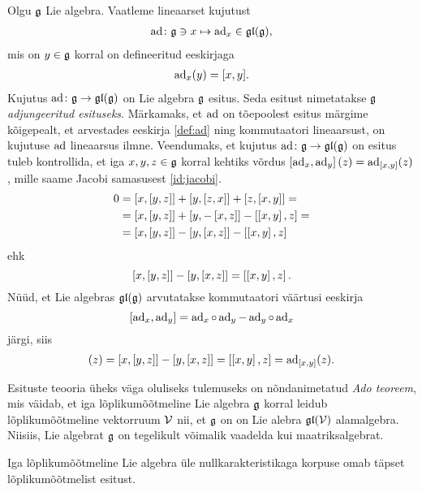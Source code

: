 \begin{naide}\label{naide:adjoint-repr}
    Olgu $\mathfrak{g}$ Lie algebra. Vaatleme lineaarset kujutust
    \begin{align*}
        \operatorname{ad} \colon \mathfrak{g} \ni x \mapsto \operatorname{ad}_x \in \mathfrak{gl}(\mathfrak{g}),
    \end{align*}
    mis on $y \in \mathfrak{g}$ korral on defineeritud eeskirjaga
    \begin{align}\label{def:ad}
        \operatorname{ad}_x(y) = [x, y].
    \end{align}
    Kujutus $\operatorname{ad} \colon \mathfrak{g} \to \mathfrak{gl}(\mathfrak{g})$ on Lie algebra $\mathfrak{g}$ esitus. Seda esitust
    nimetatakse $\mathfrak{g}$ \emph{adjungeeritud esituseks}. Märkamaks, et $\operatorname{ad}$ on
    tõepoolest esitus märgime kõigepealt, et arvestades eeskirja
    \eqref{def:ad} ning kommutaatori lineaarsust, on kujutuse $\operatorname{ad}$
    lineaarsus ilmne. Veendumaks, et kujutus $\operatorname{ad} \colon \mathfrak{g} \to \mathfrak{gl}(\mathfrak{g})$ on
    esitus tuleb kontrollida, et iga $x, y, z \in \mathfrak{g}$ korral kehtiks võrdus
    $\left[ \operatorname{ad}_x, \operatorname{ad}_y \right](z) = \operatorname{ad}_{[x, y]}(z)$, mille saame Jacobi
    samasusest \eqref{id:jacobi}.
    \begin{align*}
        0 &= \left[ x, \left[ y, z \right] \right] + \left[ y, \left[ z, x \right] \right] +
             \left[ z, \left[ x, y \right] \right] = \\
          &= \left[ x, \left[ y, z \right] \right] + \left[ y, -\left[ x, z \right] \right] -
             \left[ \left[ x, y \right], z \right] = \\
          &= \left[ x, \left[ y, z \right] \right] - \left[ y, \left[ x, z \right] \right] -
             \left[ \left[ x, y \right], z \right]
    \end{align*}
    ehk
    \[
        \left[ x, \left[ y, z \right] \right] - \left[ y, \left[ x, z \right] \right] = \left[ \left[ x, y \right], z \right].
    \]
    Nüüd, et Lie algebras $\mathfrak{gl}(\mathfrak{g})$ arvutatakse kommutaatori väärtusi eeskirja
    \[
        [\operatorname{ad}_x, \operatorname{ad}_y] = \operatorname{ad}_x \circ \operatorname{ad}_y - \operatorname{ad}_y \circ \operatorname{ad}_x
    \]
    järgi, siis
    \begin{align*}
        [\ad_x, \ad_y](z) = \brac{x}{\brac{y}{z}} - \brac{y}{\brac{x}{z}} =
        \brac{\brac{x}{y}}{z} = \ad_{\brac{x}{y}}(z).
    \end{align*}
\end{naide}

Esituste teooria üheks väga oluliseks tulemuseks on nõndanimetatud
\emph{Ado teoreem}, mis väidab, et iga lõplikumõõtmeline Lie algebra $\mathfrak{g}$
korral leidub lõplikumõõtmeline vektorruum $\mathcal{V}$ nii, et $\mathfrak{g}$ on
on Lie alebra $\mathfrak{gl}(\mathcal{V})$ alamalgebra. Niisiis, Lie algebrat $\mathfrak{g}$
on tegelikult võimalik vaadelda kui maatriksalgebrat. \cite{hall2003lie}

\begin{thm}[Ado, 1935]
    Iga lõplikumõõtmeline Lie algebra üle nullkarakteristikaga korpuse omab
    täpset lõplikumõõtmelist esitust.
\end{thm}


